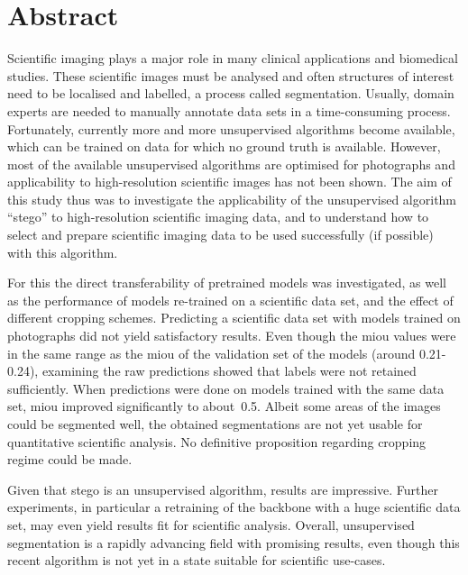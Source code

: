 \section*{Abstract}
Scientific imaging plays a major role in many clinical applications and biomedical studies. 
These scientific images must be analysed and often structures of interest need to be localised and labelled, a process called segmentation.
Usually, domain experts are needed to manually annotate data sets in a time-consuming process.
Fortunately, currently more and more unsupervised algorithms become available, which can be trained on data for which no ground truth is available.
However, most of the available unsupervised algorithms are optimised for photographs and applicability to high-resolution scientific images has not been shown.
The aim of this study thus was to investigate the applicability of the unsupervised algorithm ``\gls{stego}'' to high-resolution scientific imaging data, and to understand how to select and prepare scientific imaging data to be used successfully (if possible) with this algorithm.

For this the direct transferability of pretrained models was investigated, as well as the performance of models re-trained on a scientific data set, and the effect of different cropping schemes.
Predicting a scientific data set with models trained on photographs did not yield satisfactory results.
Even though the \gls{miou} values were in the same range as the \gls{miou} of the validation set of the models (around 0.21-0.24), examining the raw predictions showed that labels were not retained sufficiently.
When predictions were done on models trained with the same data set, \gls{miou} improved significantly to about~0.5.
Albeit some areas of the images could be segmented well, the obtained segmentations are not yet usable for quantitative scientific analysis.
No definitive proposition regarding cropping regime could be made.

Given that \gls{stego} is an unsupervised algorithm, results are impressive.
Further experiments, in particular a retraining of the backbone with a huge scientific data set, may even yield results fit for scientific analysis.
Overall, unsupervised segmentation is a rapidly advancing field with promising results, even though this recent algorithm is not yet in a state suitable for scientific use-cases.


